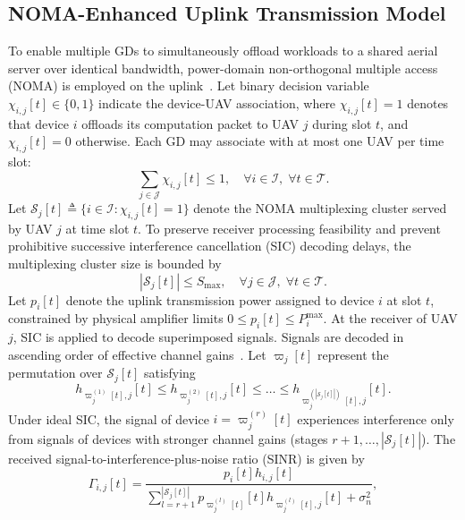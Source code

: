 \documentclass[journal]{IEEEtran}
\begin{document}
\subsection{NOMA-Enhanced Uplink Transmission Model}

To enable multiple GDs to simultaneously offload workloads to a shared aerial server over identical bandwidth, power-domain non-orthogonal multiple access (NOMA) is employed on the uplink~\cite{11020655}. Let binary decision variable $\chi_{i,j}[t] \in \{0, 1\}$ indicate the device-UAV association, where $\chi_{i,j}[t] = 1$ denotes that device $i$ offloads its computation packet to UAV $j$ during slot $t$, and $\chi_{i,j}[t] = 0$ otherwise. Each GD may associate with at most one UAV per time slot:
\begin{equation}
    \sum_{j \in \mathcal{J}} \chi_{i,j}[t] \le 1, \quad \forall i \in \mathcal{I}, \; \forall t \in \mathcal{T}.
    \label{eq:assoc_constraint}
\end{equation}
Let $\mathcal{S}_j[t] \triangleq \{i \in \mathcal{I} : \chi_{i,j}[t] = 1\}$ denote the NOMA multiplexing cluster served by UAV $j$ at time slot $t$. To preserve receiver processing feasibility and prevent prohibitive successive interference cancellation (SIC) decoding delays, the multiplexing cluster size is bounded by
\begin{equation}
    |\mathcal{S}_j[t]| \le S_{\max}, \quad \forall j \in \mathcal{J}, \; \forall t \in \mathcal{T}.
    \label{eq:noma_cluster_limit}
\end{equation}
Let $p_i[t]$ denote the uplink transmission power assigned to device $i$ at slot $t$, constrained by physical amplifier limits $0 \le p_i[t] \le P_i^{\max}$. At the receiver of UAV $j$, SIC is applied to decode superimposed signals. Signals are decoded in ascending order of effective channel gains~\cite{11020655}. Let $\varpi_j[t]$ represent the permutation over $\mathcal{S}_j[t]$ satisfying
\begin{equation}
    h_{\varpi_j^{(1)}[t], j}[t] \le h_{\varpi_j^{(2)}[t], j}[t] \le \dots \le h_{\varpi_j^{(|\mathcal{S}_j[t]|)}[t], j}[t].
\end{equation}
Under ideal SIC, the signal of device $i = \varpi_j^{(r)}[t]$ experiences interference only from signals of devices with stronger channel gains (stages $r+1, \dots, |\mathcal{S}_j[t]|$). The received signal-to-interference-plus-noise ratio (SINR) is given by
\begin{equation}
    \Gamma_{i,j}[t] = \frac{p_i[t] h_{i,j}[t]}{\sum_{l = r+1}^{|\mathcal{S}_j[t]|} p_{\varpi_j^{(l)}[t]}[t] h_{\varpi_j^{(l)}[t], j}[t] + \sigma_n^2},
    \label{eq:sinr_noma}
\end{equation}
\end{document}
